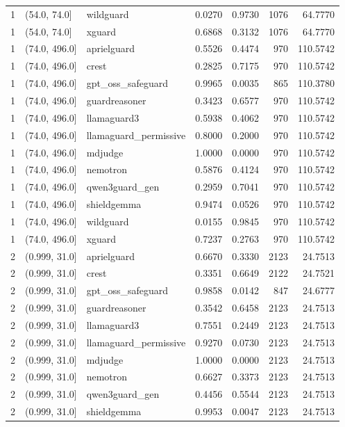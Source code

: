\begin{tabular}{rllrrrr}
1 & (54.0, 74.0] & wildguard & 0.0270 & 0.9730 & 1076 & 64.7770 \\
1 & (54.0, 74.0] & xguard & 0.6868 & 0.3132 & 1076 & 64.7770 \\
1 & (74.0, 496.0] & aprielguard & 0.5526 & 0.4474 & 970 & 110.5742 \\
1 & (74.0, 496.0] & crest & 0.2825 & 0.7175 & 970 & 110.5742 \\
1 & (74.0, 496.0] & gpt\_oss\_safeguard & 0.9965 & 0.0035 & 865 & 110.3780 \\
1 & (74.0, 496.0] & guardreasoner & 0.3423 & 0.6577 & 970 & 110.5742 \\
1 & (74.0, 496.0] & llamaguard3 & 0.5938 & 0.4062 & 970 & 110.5742 \\
1 & (74.0, 496.0] & llamaguard\_permissive & 0.8000 & 0.2000 & 970 & 110.5742 \\
1 & (74.0, 496.0] & mdjudge & 1.0000 & 0.0000 & 970 & 110.5742 \\
1 & (74.0, 496.0] & nemotron & 0.5876 & 0.4124 & 970 & 110.5742 \\
1 & (74.0, 496.0] & qwen3guard\_gen & 0.2959 & 0.7041 & 970 & 110.5742 \\
1 & (74.0, 496.0] & shieldgemma & 0.9474 & 0.0526 & 970 & 110.5742 \\
1 & (74.0, 496.0] & wildguard & 0.0155 & 0.9845 & 970 & 110.5742 \\
1 & (74.0, 496.0] & xguard & 0.7237 & 0.2763 & 970 & 110.5742 \\
2 & (0.999, 31.0] & aprielguard & 0.6670 & 0.3330 & 2123 & 24.7513 \\
2 & (0.999, 31.0] & crest & 0.3351 & 0.6649 & 2122 & 24.7521 \\
2 & (0.999, 31.0] & gpt\_oss\_safeguard & 0.9858 & 0.0142 & 847 & 24.6777 \\
2 & (0.999, 31.0] & guardreasoner & 0.3542 & 0.6458 & 2123 & 24.7513 \\
2 & (0.999, 31.0] & llamaguard3 & 0.7551 & 0.2449 & 2123 & 24.7513 \\
2 & (0.999, 31.0] & llamaguard\_permissive & 0.9270 & 0.0730 & 2123 & 24.7513 \\
2 & (0.999, 31.0] & mdjudge & 1.0000 & 0.0000 & 2123 & 24.7513 \\
2 & (0.999, 31.0] & nemotron & 0.6627 & 0.3373 & 2123 & 24.7513 \\
2 & (0.999, 31.0] & qwen3guard\_gen & 0.4456 & 0.5544 & 2123 & 24.7513 \\
2 & (0.999, 31.0] & shieldgemma & 0.9953 & 0.0047 & 2123 & 24.7513 \\

\end{tabular}
